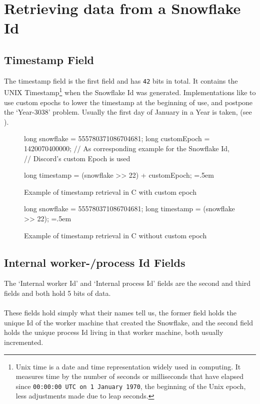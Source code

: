 \documentclass{article}
\newcommand{\code}[1]{\colorbox{cverbbg}{\texttt{#1}}}
\newcommand{\hn}[0]{\hfill \\}
\newenvironment{lcverbatim}
{\SaveVerbatim{cverb}}
{\endSaveVerbatim{}
	\flushleft\fboxrule=0pt\fboxsep=.5em
	\colorbox{cverbbg}{%

		\makebox[\dimexpr\linewidth-2\fboxsep][l]{\BUseVerbatim{cverb}}%
	}
	\endflushleft{}
}
\begin{document}
\pagebreak

\section{Retrieving data from a Snowflake Id}

\subsection{Timestamp Field}
The timestamp field is the first field and has \code{42} bits in total. It
contains the UNIX Timestamp\footnote{Unix time is a date and time
	representation widely used in computing. It measures time by the number
	of
	seconds or milliseconds that have elapsed since \texttt{00:00:00 UTC on
		1
		January 1970}, the beginning of the Unix epoch, less
	adjustments made
	due to
	leap seconds.} when the Snowflake Id was generated. Implementations
like to
use
custom epochs to lower the timestamp at the beginning of use, and postpone the
`Year-3038' problem. Usually the first day of January in a Year is taken, (see ).

\begin{figure}[H]
	\begin{lcverbatim}
	long snowflake = 555780371086704681;
	long customEpoch = 1420070400000;
	// As corresponding example for the Snowflake Id,
	// Discord's custom Epoch is used

	long timestamp = (snowflake >> 22) + customEpoch;
	\end{lcverbatim}
	\caption{Example of timestamp retrieval in C with custom
		epoch}\label{fig:r_timestamp_1}
\end{figure}

\begin{figure}[H]
	\begin{lcverbatim}
	long snowflake = 555780371086704681;
	long timestamp = (snowflake >> 22);
	\end{lcverbatim}
	\caption{Example of timestamp retrieval in C without custom
		epoch}\label{fig:r_timestamp_2}
\end{figure}

\subsection{Internal worker-/process Id Fields}
The `Internal worker Id' and `Internal process Id' fields are the second and
third fields and both hold 5 bits of data. \\
\hn{}
These fields hold simply what their names tell us, the former field holds the
unique Id of the worker machine that created the Snowflake, and the second
field holds the unique process Id living in that worker machine, both usually
incremented. \\
\end{document}
